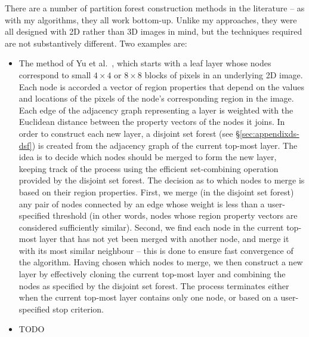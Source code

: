 There are a number of partition forest construction methods in the literature \cite{?} -- as with my algorithms, they all work bottom-up. Unlike my approaches, they were all designed with 2D rather than 3D images in mind, but the techniques required are not substantively different. Two examples are:
%
\begin{itemize}

\item The method of Yu et al.\ \cite{yu02}, which starts with a leaf layer whose nodes correspond to small $4 \times 4$ or $8 \times 8$ blocks of pixels in an underlying 2D image. Each node is accorded a vector of region properties that depend on the values and locations of the pixels of the node's corresponding region in the image. Each edge of the adjacency graph representing a layer is weighted with the Euclidean distance between the property vectors of the nodes it joins. In order to construct each new layer, a disjoint set forest (see \S\ref{sec:appendixds-dsf}) is created from the adjacency graph of the current top-most layer. The idea is to decide which nodes should be merged to form the new layer, keeping track of the process using the efficient set-combining operation provided by the disjoint set forest. The decision as to which nodes to merge is based on their region properties. First, we merge (in the disjoint set forest) any pair of nodes connected by an edge whose weight is less than a user-specified threshold (in other words, nodes whose region property vectors are considered sufficiently similar). Second, we find each node in the current top-most layer that has not yet been merged with another node, and merge it with its most similar neighbour -- this is done to ensure fast convergence of the algorithm. Having chosen which nodes to merge, we then construct a new layer by effectively cloning the current top-most layer and combining the nodes as specified by the disjoint set forest. The process terminates either when the current top-most layer contains only one node, or based on a user-specified stop criterion.

\item TODO

\end{itemize}
%
